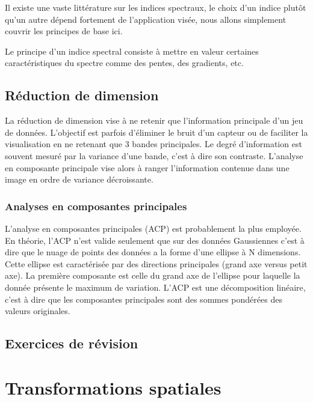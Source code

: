 \documentclass[
  11pt,
  letterpaper,
  open=any,
  twoside=false,
  french]{scrbook}
\begin{document}
Il existe une vaste littérature sur les indices spectraux, le choix d'un
indice plutôt qu'un autre dépend fortement de l'application visée, nous
allons simplement couvrir les principes de base ici.

Le principe d'un indice spectral consiste à mettre en valeur certaines
caractéristiques du spectre comme des pentes, des gradients, etc.

\section{Réduction de dimension}\label{ruxe9duction-de-dimension}

La réduction de dimension vise à ne retenir que l'information principale
d'un jeu de données. L'objectif est parfois d'éliminer le bruit d'un
capteur ou de faciliter la visualisation en ne retenant que 3 bandes
principales. Le degré d'information est souvent mesuré par la variance
d'une bande, c'est à dire son contraste. L'analyse en composante
principale vise alors à ranger l'information contenue dans une image en
ordre de variance décroissante.

\subsection{Analyses en composantes
principales}\label{analyses-en-composantes-principales}

L'analyse en composantes principales (ACP) est probablement la plus
employée. En théorie, l'ACP n'est valide seulement que sur des données
Gaussiennes c'est à dire que le nuage de points des données a la forme
d'une ellipse à N dimensions. Cette ellipse est caractérisée par des
directions principales (grand axe versus petit axe). La première
composante est celle du grand axe de l'ellipse pour laquelle la donnée
présente le maximum de variation. L'ACP est une décomposition linéaire,
c'est à dire que les composantes principales sont des sommes pondérées
des valeurs originales.

\section{Exercices de révision}\label{exercices-de-ruxe9vision}


\chapter{Transformations spatiales}\label{sec-chap04}
\end{document}
